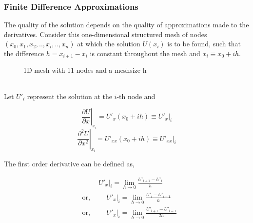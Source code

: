 \subsubsection{Finite Difference Approximations}
The quality of the solution depends on the quality of approximations made to the derivatives.
Consider this one-dimensional structured mesh of nodes $(x_0,x_1,x_2,..,x_i,..,x_n)$ at which the solution $U(x_i)$  is to be found, such that the difference $h = x_{i+1} - x_i $ is constant throughout the mesh and $x_i \equiv x_0 + ih$.\\
\begin{figure}[h]
\centering


\caption{\small 1D mesh with 11 nodes and a meshsize h}
\end{figure}
\\
Let $U'_i$ represent the solution at the $i$-th node and \hfill
{}
\begin{equation*}
    \left. \frac{\partial U}{\partial x} \right|_{x_ i} = U'_{x}(x_0 + ih) \equiv U'_{x}|_i
\end{equation*} 
\begin{equation*}
    \left. \frac{\partial^2 U}{\partial x^2} \right|_{x_ i} = U'_{xx}(x_0 + ih) \equiv U'_{xx}|_i
\end{equation*}

The first order derivative can be defined as,
{\raggedright 
\begin{align*}
    &\text{} \hspace{1cm} U'_x|_i = \lim_{h \to 0} \frac{U'_{i+1} - U'_i}{h}  \\
    &\text{or,} \hspace{1cm} U'_x|_i = \lim_{h \to 0} \frac{U'_{i} - U'_{i-1}}{h}  \\
    &\text{or,} \hspace{1cm} U'_x|_i = \lim_{h \to 0} \frac{U'_{i+1} - U'_{i-1}}{2h}  
\end{align*}
}

